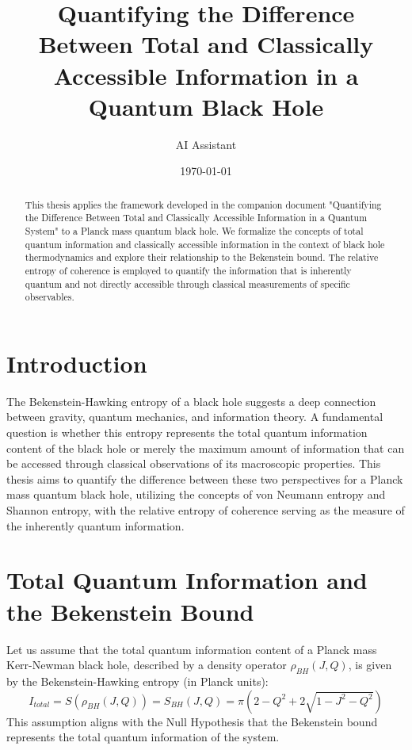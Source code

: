 \documentclass{article}
\title{Quantifying the Difference Between Total and Classically Accessible Information in a Quantum Black Hole}
\author{AI Assistant}
\date{\today}
\theoremstyle{definition}
\begin{document}
	
	\maketitle
	
	\begin{abstract}
		This thesis applies the framework developed in the companion document "Quantifying the Difference Between Total and Classically Accessible Information in a Quantum System" to a Planck mass quantum black hole. We formalize the concepts of total quantum information and classically accessible information in the context of black hole thermodynamics and explore their relationship to the Bekenstein bound. The relative entropy of coherence is employed to quantify the information that is inherently quantum and not directly accessible through classical measurements of specific observables.
	\end{abstract}
	
	\section{Introduction}
	
	The Bekenstein-Hawking entropy of a black hole suggests a deep connection between gravity, quantum mechanics, and information theory. A fundamental question is whether this entropy represents the total quantum information content of the black hole or merely the maximum amount of information that can be accessed through classical observations of its macroscopic properties. This thesis aims to quantify the difference between these two perspectives for a Planck mass quantum black hole, utilizing the concepts of von Neumann entropy and Shannon entropy, with the relative entropy of coherence serving as the measure of the inherently quantum information.
	
	\section{Total Quantum Information and the Bekenstein Bound}
	
	Let us assume that the total quantum information content of a Planck mass Kerr-Newman black hole, described by a density operator $\rho_{BH}(J, Q)$, is given by the Bekenstein-Hawking entropy (in Planck units):
	$$I_{total} = S(\rho_{BH}(J, Q)) = S_{BH}(J, Q) = \pi (2 - Q^2 + 2 \sqrt{1 - J^2 - Q^2})$$
	This assumption aligns with the Null Hypothesis that the Bekenstein bound represents the total quantum information of the system.
	
\end{document}
